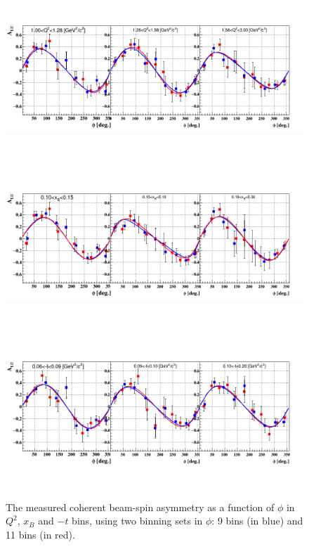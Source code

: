 \begin{figure}[tbp]
   \centering
      \includegraphics[height=6.2cm]{fig_dvcs/sBSA_Coherent_Q2.png}
      \includegraphics[height=6.2cm]{fig_dvcs/sBSA_Coherent_xB.png}
      \includegraphics[height=6.2cm]{fig_dvcs/sBSA_Coherent_t.png}
     \caption{The measured coherent beam-spin asymmetry as
     a function of $\phi$ in $Q^{2}$, $x_B$ and $-t$ bins, using two binning 
  sets in $\phi$: 9 bins (in blue) and 11 bins (in red).}
      \label{fig:coh_bins_phi_9_11}
    \end{figure}

